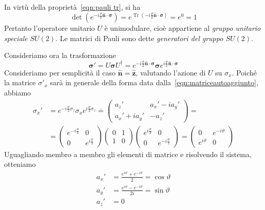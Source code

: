 In virtù della proprietà~\eqref{eqn:pauli tr}, si ha
\begin{equation}
\det(e^{-i\frac{\vartheta}{2}\hat{\textbf{n}}\cdot\boldsymbol\sigma})=e^{\operatorname{Tr}{\left(-i\frac{\vartheta}{2}\hat{\textbf{n}}\cdot\boldsymbol\sigma\right)}}=e^0=1
\end{equation}
Pertanto l'operatore unitario $U$ è unimodulare, cioè appartiene al \textit{gruppo unitario speciale} $SU(2)$. Le matrici di Pauli sono dette \textit{generatori del gruppo $SU(2)$}. 

\medskip
Consideriamo ora la trasformazione
\begin{equation}
\boldsymbol\sigma'=U \boldsymbol\sigma U^{\dagger}=e^{-i\frac{\vartheta}{2}\hat{\textbf{n}}\cdot\boldsymbol\sigma} \boldsymbol\sigma e^{i\frac{\vartheta}{2}\hat{\textbf{n}}\cdot\boldsymbol\sigma}
\end{equation}
Consideriamo per semplicità il caso $\hat{\textbf{n}}=\hat{\textbf{z}}$, valutando l'azione di $U$ su $\sigma_x$. Poiché la matrice $\sigma'_x$ sarà in generale della forma data dalla~\eqref{eqn:matriceautoaggiunto}, abbiamo
\begin{equation} \begin{split}
\sigma_x'&= e^{-i\frac{\vartheta}{2}\sigma_z}\sigma_xe^{i\frac{\vartheta}{2}\sigma_z} \doteq 
\begin{pmatrix}
a_z' & a_x'-ia_y' \\
a_x'+ia_y' & -a_z'
\end{pmatrix}
= \\ &=
\begin{pmatrix}
e^{-i\frac{\vartheta}{2}} & 0 \\
0 & e^{i\frac{\vartheta}{2}}
\end{pmatrix}
\begin{pmatrix}
0 & 1 \\
1 & 0
\end{pmatrix}
\begin{pmatrix}
e^{i\frac{\vartheta}{2}} & 0 \\
0 & e^{-i\frac{\vartheta}{2}}
\end{pmatrix}
=
\begin{pmatrix}
0 & e^{-i\vartheta} \\
e^{i\vartheta} & 0
\end{pmatrix}
\end{split} \end{equation}
Uguagliando membro a membro gli elementi di matrice e risolvendo il sistema, otteniamo
\begin{subequations} \begin{align}
a_x'&=\frac{e^{i\vartheta}+e^{-i\vartheta}}{2}=\cos{\vartheta} \\
a_y'&=\frac{e^{i\vartheta}-e^{-i\vartheta}}{2i}=\sin{\vartheta} \\
a_z'&=0
\end{align} \end{subequations}
